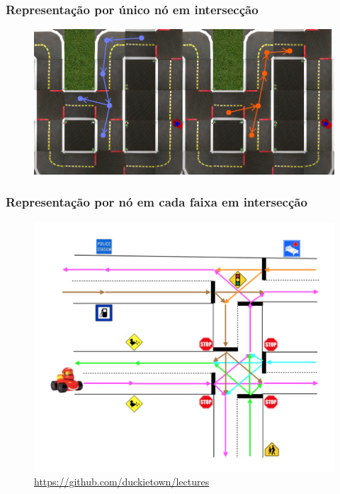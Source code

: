 \documentclass{beamer}
\begin{document}
\begin{frame}
  \frametitle{Representação por único nó em intersecção}

  \begin{figure}
    \centering\includegraphics[width=\textwidth]{first_rep.png}
  \end{figure}
\end{frame}

\begin{frame}
  \frametitle{Representação por nó em cada faixa em intersecção}

  \begin{figure}
    \centering\includegraphics[height=0.7\textheight]{sec_rep.png}
    \caption*{\url{https://github.com/duckietown/lectures}}
  \end{figure}
\end{frame}
\end{document}
